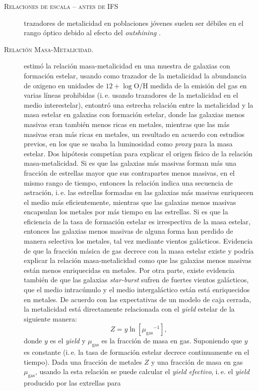 \documentclass[xcolor=dvipsnames,4pt]{beamer}
\begin{document}
\begin{frame}[allowframebreaks]{\textsc{Relaciones de escala -- antes de IFS}}
\begin{description}
trazadores de metalicidad en poblaciones jóvenes suelen ser débiles en el rango óptico debido al
efecto del \emph{outshining} \citep[e.\,g.][]{Conroy2013a}.
%
\item[\textsc{Relación Masa-Metalicidad.}] \citet{Tremonti2004} estimó la relación masa-metalicidad
en una muestra de galaxias con formación estelar, usando como trazador de la metalicidad la
abundancia de oxigeno en unidades de $12+\log{\text{O}/\text{H}}$ medida de la emisión del gas en
varias líneas prohibidas (i.\,e. usando trazadores de la metalicidad en el medio interestelar),
entontró una estrecha relación entre la metalicidad y la masa estelar en galaxias con formación
estelar, donde las galaxias menos masivas eran también menos ricas en metales, mientras que las más
masivas eran más ricas en metales, un resultado en acuerdo con estudios previos, en los que se usaba
la luminosidad como \emph{proxy} para la masa estelar. Dos hipótesis competían para explicar el
origen físico de la relación masa-metalicidad. Si es que las galaxias más masivas forman más una
fracción de estrellas mayor que sus contrapartes menos masivas, en el mismo rango de tiempo,
entonces la relación indica una secuencia de astración, i.\,e. las estrellas formadas en las
galaxias más masivas enriquecen el medio más eficientemente, mientras que las galaxias menos masivas
encapsulan los metales por más tiempo en las estrellas. Si es que la eficiencia de la tasa de
formación estelar es irrespectiva de la masa estelar, entonces las galaxias menos masivas de alguna
forma han perdido de manera selectiva los metales, tal vez mediante vientos galácticos. Evidencia de
que la fracción másica de gas decrece con la masa estelar existe \citep{Bell2000} y podría explicar
la relación masa-metalicidad como que las galaxias menos masivas están menos enriquecidas en
metales. Por otra parte, existe evidencia también de que las galaxias \emph{star-burst} sufren de
fuertes vientos galácticos, que el medio intracúmulo y el medio intergaláctico están está
enriquecidos en metales.
%
De acuerdo con las expectativas de un modelo de caja cerrada, la metalicidad está directamente
relacionada con el \emph{yield} estelar de la siguiente manera:
%
$$
Z = y\ln{\left[{\mu_\text{gas}}^{-1}\right]},
$$
%
donde $y$ es el \emph{yield} y $\mu_\text{gas}$ es la fracción de masa en gas. Suponiendo que $y$ es
constante (i.\,e. la tasa de formación estelar decrece continuamente en el tiempo). Dada una
fracción de metales $Z$ y una fracción de masa en gas $\mu_\text{gas}$, usando la esta relación se
puede calcular el \emph{yield efectivo}, i.\,e. el \emph{yield} producido por las extrellas para

\end{description}
\end{frame}
\end{document}
